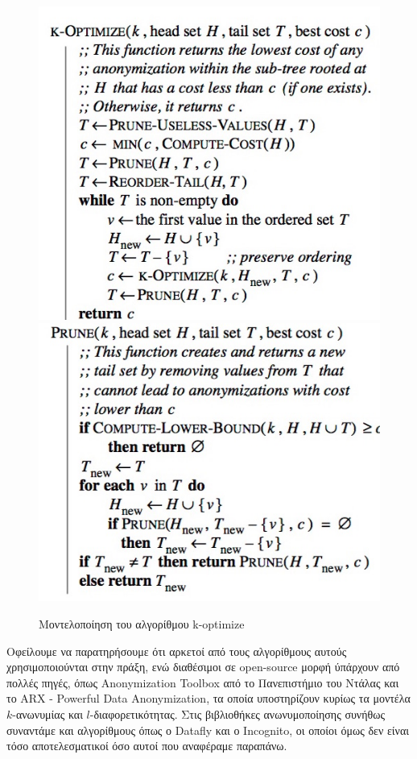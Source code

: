 \begin{figure} [ht]
\begin{center}
  \includegraphics[scale=0.5]{images/optimize1.jpg}
  \includegraphics[scale=0.5]{images/optimize2.jpg}
  \caption{Μοντελοποίηση του αλγορίθμου \textlatin{k-optimize}  }
  \end{center}
\end{figure}

Οφείλουμε να παρατηρήσουμε ότι αρκετοί από τους αλγορίθμους αυτούς χρησιμοποιούνται στην πράξη, ενώ διαθέσιμοι σε \textlatin{open-source} μορφή ύπάρχουν από πολλές πηγές, όπως \textlatin{Anonymization Toolbox}  από το Πανεπιστήμιο του Ντάλας και το \textlatin{ARX - Powerful Data Anonymization}, τα οποία υποστηρίζουν κυρίως τα μοντέλα $k$-ανωνυμίας και $l$-διαφορετικότητας. Στις βιβλιοθήκες ανωνυμοποίησης συνήθως συναντάμε και αλγορίθμους όπως ο \textlatin{Datafly} και ο \textlatin{Incognito}, οι οποίοι όμως δεν είναι τόσο αποτελεσματικοί όσο αυτοί που αναφέραμε παραπάνω.

